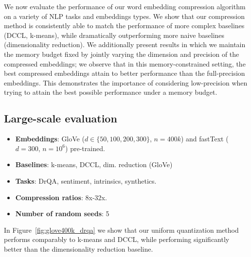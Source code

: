 We now evaluate the performance of our word embedding compression algorithm on a variety of NLP tasks and embeddings types.
We show that our compression method is consistently able to match the performance of more complex baselines (DCCL, k-means), while dramatically outperforming more naive baselines (dimensionality reduction).
We additionally present results in which we maintain the memory budget fixed by  jointly varying the dimension and precision of the compressed embeddings;
we observe that in this memory-constrained setting, the best compressed embeddings attain  to  better performance than the full-precision embeddings.
This demonstrates the importance of considering low-precision when trying to attain the best possible performance under a memory budget.

\subsection{Large-scale evaluation}
\begin{itemize}
	\item \textbf{Embeddings}: GloVe ($d\in\{50,100,200,300\}$, $n=400k$) and fastText ($d=300$, $n=10^6$) pre-trained.
	\item \textbf{Baselines}: k-means, DCCL, dim. reduction (GloVe)
	\item \textbf{Tasks}: DrQA, sentiment, intrinsics, synthetics.
	\item \textbf{Compression ratios}: 8x-32x.
	\item \textbf{Number of random seeds}: 5
\end{itemize}

In Figure~\ref{fig:glove400k_drqa} we show that our uniform quantization method performs comparably to k-means and DCCL, while performing significantly better than the dimensionality reduction baseline.





